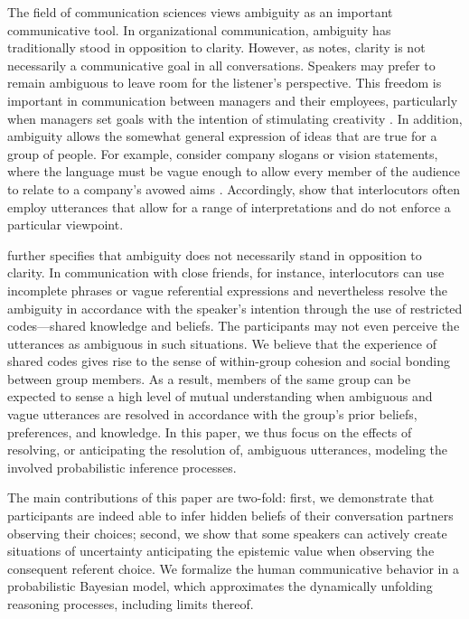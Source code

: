 \documentclass[11pt,a4paper]{article}
\newcommand{\gcs}[1]{\textcolor{blue}{[gcs: #1]}}
\begin{document}
The field of communication sciences views ambiguity as an important communicative tool. %
In organizational communication, ambiguity has traditionally stood in opposition to clarity. However, as  notes, clarity is not necessarily a communicative goal in all conversations. Speakers may prefer to remain ambiguous to leave room for the listener's perspective. This freedom is important in communication between managers and their employees, particularly when managers set goals with the intention of stimulating creativity \cite{mohr1983implications}.
In addition, ambiguity allows the somewhat general expression of ideas that are true for a group of people. 
For example, consider company slogans or vision statements, where the language must be vague enough to allow every member of the audience to relate to a company's avowed aims \cite{carmon2013}. 
Accordingly,  show that interlocutors often employ utterances that allow for a range of interpretations and do not enforce a particular viewpoint.

 further specifies that ambiguity does not necessarily stand in opposition to clarity. In communication with close friends, for instance, interlocutors can use incomplete phrases or vague referential expressions and nevertheless resolve the ambiguity in accordance with the speaker's intention through the use of restricted codes---shared knowledge and beliefs. The participants may not even perceive the utterances as ambiguous in such situations. We believe that the experience of shared codes gives rise to the sense of within-group cohesion and social bonding between group members.
As a result, members of the same group can be expected to sense a high level of mutual understanding when ambiguous and vague utterances are resolved in accordance with the group's prior beliefs, preferences, and knowledge.
In this paper, we thus focus on the effects of resolving, or anticipating the resolution of, ambiguous utterances, modeling the involved probabilistic inference processes. 

The main contributions of this paper are two-fold: first, we demonstrate that participants are indeed able to infer hidden beliefs of their conversation partners observing their choices; second, we show that some speakers can actively create situations of uncertainty anticipating the epistemic value when observing the consequent referent choice. 
We formalize the human communicative behavior in a probabilistic Bayesian model, which approximates the dynamically unfolding reasoning processes, including limits thereof. 
\end{document}
